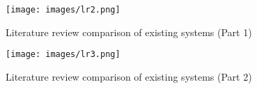 \begin{figure}[h!]
    \centering
    \texttt{[image: images/lr2.png]}
    \caption{Literature review comparison of existing systems (Part 1)}
\end{figure}

\begin{figure}[h!]
    \centering
    \texttt{[image: images/lr3.png]}
    \caption{Literature review comparison of existing systems (Part 2)}
\end{figure}